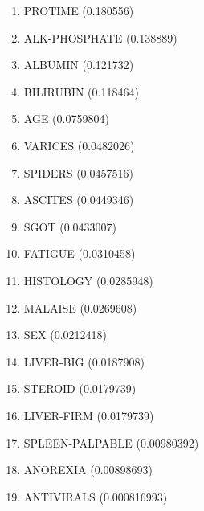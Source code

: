 \begin{enumerate}
\item PROTIME (0.180556)
\item ALK-PHOSPHATE (0.138889)
\item ALBUMIN (0.121732)
\item BILIRUBIN (0.118464)
\item AGE (0.0759804)
\item VARICES (0.0482026)
\item SPIDERS (0.0457516)
\item ASCITES (0.0449346)
\item SGOT (0.0433007)
\item FATIGUE (0.0310458)
\item HISTOLOGY (0.0285948)
\item MALAISE (0.0269608)
\item SEX (0.0212418)
\item LIVER-BIG (0.0187908)
\item STEROID (0.0179739)
\item LIVER-FIRM (0.0179739)
\item SPLEEN-PALPABLE (0.00980392)
\item ANOREXIA (0.00898693)
\item ANTIVIRALS (0.000816993)
\end{enumerate}